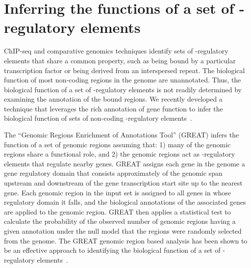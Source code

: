 \section{Inferring the functions of a set of \cis-regulatory elements}
ChIP-seq and comparative genomics techniques identify sets of \cis-regulatory elements that share a common property, such
as being bound by a particular transcription factor or being derived from an interspersed repeat.  The biological function
of most non-coding regions in the genome are unannotated.  Thus, the biological function of a set of \cis-regulatory elements
is not readily determined by examining the annotation of the bound regions.  We recently developed a technique that leverages
the rich annotation of gene function to infer the biological function of sets of non-coding \cis-regulatory elements~\citep{McLean2010}.
%

The ``Genomic Regions Enrichment of Annotations Tool'' (GREAT) infers the function of a set of genomic regions assuming that:
1) many of the genomic regions share a functional role, and 2) the genomic regions act as \cis-regulatory elements that regulate
nearby genes.  GREAT assigns each gene in the genome a gene regulatory domain that consists approximately of the genomic span
upstream and downstream of the gene transcription start site up to the nearest gene.  Each genomic region in the input set is
assigned to all genes in whose regulatory domain it falls, and the biological annotations of the associated genes are applied
to the genomic region.  GREAT then applies a statistical test to calculate the probability of the observed number of genomic
regions having a given annotation under the null model that the regions were randomly selected from the genome.  The GREAT genomic region
based analysis has been shown to be an effective approach to identifying the biological function of a set of \cis-regulatory
elements~\citep{McLean2010}.

